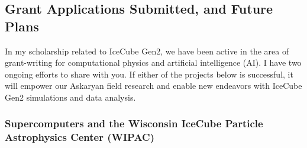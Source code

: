 \documentclass[../../../main.tex]{subfiles}
\begin{document}
\subsection{Grant Applications Submitted, and Future Plans}

In my scholarship related to IceCube Gen2, we have been active in the area of grant-writing for computational physics and artificial intelligence (AI).  I have two ongoing efforts to share with you.  If either of the projects below is successful, it will empower our Askaryan field research and enable new endeavors with IceCube Gen2 simulations and data analysis.

\subsubsection{Supercomputers and the Wisconsin IceCube Particle Astrophysics Center (WIPAC)}
\end{document}
